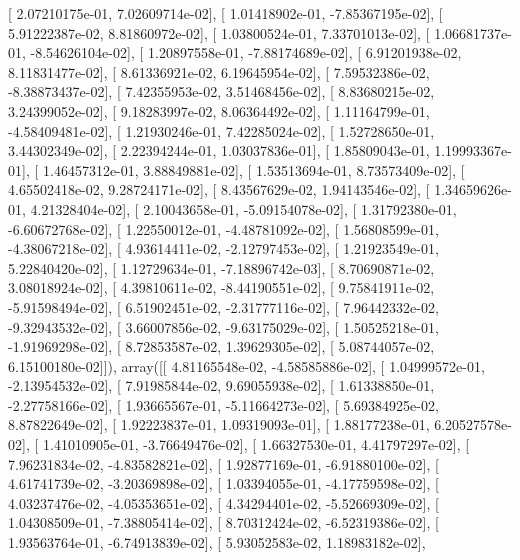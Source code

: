 \documentclass{article}
\begin{document}
       [  2.07210175e-01,   7.02609714e-02],
       [  1.01418902e-01,  -7.85367195e-02],
       [  5.91222387e-02,   8.81860972e-02],
       [  1.03800524e-01,   7.33701013e-02],
       [  1.06681737e-01,  -8.54626104e-02],
       [  1.20897558e-01,  -7.88174689e-02],
       [  6.91201938e-02,   8.11831477e-02],
       [  8.61336921e-02,   6.19645954e-02],
       [  7.59532386e-02,  -8.38873437e-02],
       [  7.42355953e-02,   3.51468456e-02],
       [  8.83680215e-02,   3.24399052e-02],
       [  9.18283997e-02,   8.06364492e-02],
       [  1.11164799e-01,  -4.58409481e-02],
       [  1.21930246e-01,   7.42285024e-02],
       [  1.52728650e-01,   3.44302349e-02],
       [  2.22394244e-01,   1.03037836e-01],
       [  1.85809043e-01,   1.19993367e-01],
       [  1.46457312e-01,   3.88849881e-02],
       [  1.53513694e-01,   8.73573409e-02],
       [  4.65502418e-02,   9.28724171e-02],
       [  8.43567629e-02,   1.94143546e-02],
       [  1.34659626e-01,   4.21328404e-02],
       [  2.10043658e-01,  -5.09154078e-02],
       [  1.31792380e-01,  -6.60672768e-02],
       [  1.22550012e-01,  -4.48781092e-02],
       [  1.56808599e-01,  -4.38067218e-02],
       [  4.93614411e-02,  -2.12797453e-02],
       [  1.21923549e-01,   5.22840420e-02],
       [  1.12729634e-01,  -7.18896742e-03],
       [  8.70690871e-02,   3.08018924e-02],
       [  4.39810611e-02,  -8.44190551e-02],
       [  9.75841911e-02,  -5.91598494e-02],
       [  6.51902451e-02,  -2.31777116e-02],
       [  7.96442332e-02,  -9.32943532e-02],
       [  3.66007856e-02,  -9.63175029e-02],
       [  1.50525218e-01,  -1.91969298e-02],
       [  8.72853587e-02,   1.39629305e-02],
       [  5.08744057e-02,   6.15100180e-02]]), array([[  4.81165548e-02,  -4.58585886e-02],
       [  1.04999572e-01,  -2.13954532e-02],
       [  7.91985844e-02,   9.69055938e-02],
       [  1.61338850e-01,  -2.27758166e-02],
       [  1.93665567e-01,  -5.11664273e-02],
       [  5.69384925e-02,   8.87822649e-02],
       [  1.92223837e-01,   1.09319093e-01],
       [  1.88177238e-01,   6.20527578e-02],
       [  1.41010905e-01,  -3.76649476e-02],
       [  1.66327530e-01,   4.41797297e-02],
       [  7.96231834e-02,  -4.83582821e-02],
       [  1.92877169e-01,  -6.91880100e-02],
       [  4.61741739e-02,  -3.20369898e-02],
       [  1.03394055e-01,  -4.17759598e-02],
       [  4.03237476e-02,  -4.05353651e-02],
       [  4.34294401e-02,  -5.52669309e-02],
       [  1.04308509e-01,  -7.38805414e-02],
       [  8.70312424e-02,  -6.52319386e-02],
       [  1.93563764e-01,  -6.74913839e-02],
       [  5.93052583e-02,   1.18983182e-02],
\end{document}
